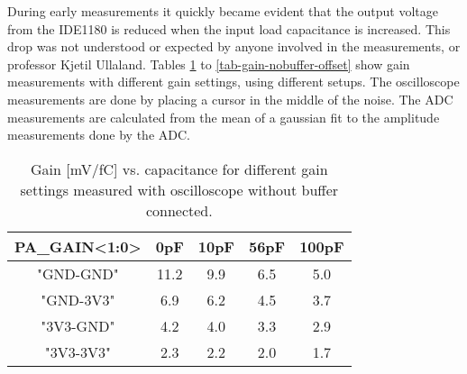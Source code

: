 \documentclass[../main/thesis.tex]{subfiles}
\begin{document}
During early measurements it quickly became evident that the output voltage from the IDE1180 is reduced when the input load capacitance is increased. This drop was not understood or expected by anyone involved in the measurements, or professor Kjetil Ullaland. Tables \ref{tab-gain-nobuffer} to \ref{tab-gain-nobuffer-offset} show gain measurements with different gain settings, using different setups. The oscilloscope measurements are done by placing a cursor in the middle of the noise. The ADC measurements are calculated from the mean of a gaussian fit to the amplitude measurements done by the ADC. 

\begin{table}[h!]
	\begin{center}
		\caption{Gain [mV/fC] vs. capacitance for different gain settings measured with oscilloscope without buffer connected.}
		\label{tab-gain-nobuffer}
		\begin{tabular}{ccccc}\toprule
			\textbf{PA\_GAIN<1:0>} & \textbf{0pF}  & \textbf{10pF} & \textbf{56pF} & \textbf{100pF} \\ \midrule
			"GND-GND"     & 11.2 & 9.9 & 6.5  & 5.0   \\
			"GND-3V3"     & 6.9    & 6.2  & 4.5  & 3.7   \\
			"3V3-GND"     & 4.2  & 4.0  & 3.3  & 2.9     \\
			"3V3-3V3"     & 2.3  & 2.2  & 2.0    & 1.7 \\ \bottomrule
		\end{tabular}
	\end{center}
\end{table}
\end{document}
